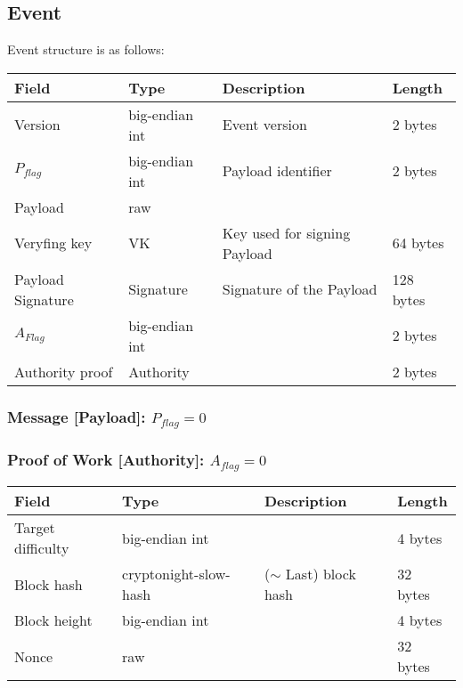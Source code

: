 \documentclass[a4paper,10pt]{article}
\begin{document}
        \subsection{Event}
            Event structure is as follows:\\
            \begin{tabularx}{\textwidth}{|l|l|X|l|}
                \hline Field & Type & Description & Length \\ \hline
                \hline Version & big-endian int & Event version & 2 bytes \\
                \hline $P_{flag}$ & big-endian int & Payload identifier & 2 bytes \\
                \hline Payload & raw &  & \\
                \hline Veryfing key & VK & Key used for signing Payload & 64 bytes \\
                \hline Payload Signature & Signature & Signature of the Payload & 128 bytes \\
                \hline $A_{Flag}$ & big-endian int & & 2 bytes\\
                \hline Authority proof & Authority & & 2 bytes\\
                \hline
            \end{tabularx}
                \subsubsection{Message [Payload]: $P_{flag} = 0$}
                \subsubsection{Proof of Work [Authority]: $A_{flag} = 0$}
                    \begin{tabularx}{\textwidth}{|l|l|X|l|}
                        \hline Field & Type & Description & Length \\ \hline
                        \hline Target difficulty & big-endian int &  & 4 bytes \\
                        \hline Block hash & cryptonight-slow-hash & ($\sim$ Last) block hash & 32 bytes \\
                        \hline Block height & big-endian int & & 4 bytes \\
                        \hline Nonce & raw & & 32 bytes \\
                        \hline
                    \end{tabularx}
\end{document}
